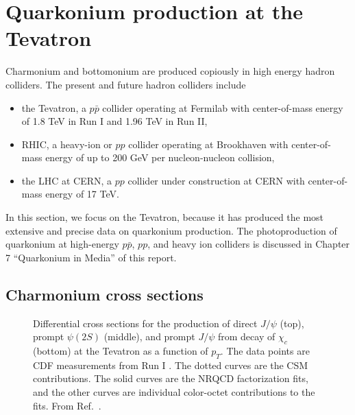 \section{Quarkonium production at the Tevatron}
\label{prodsec:tevatron}
Charmonium and bottomonium are produced copiously in high energy hadron
colliders. The present and future hadron colliders include
%
\begin{itemize}

\item the Tevatron, 
a $p \bar p$ collider operating at Fermilab with center-of-mass energy 
of 1.8 TeV in Run I and 1.96 TeV in Run II,
 
\item RHIC, 
a heavy-ion or $p p$ collider operating at Brookhaven with 
center-of-mass energy of up to 200 GeV per nucleon-nucleon collision,

\item 
the LHC at CERN, a $p p$ collider under construction at CERN 
with center-of-mass energy of 17 TeV.
\end{itemize}
%
In this section, we focus on the Tevatron, because it has produced 
the most extensive and precise data on quarkonium production.
The photoproduction of quarkonium at high-energy $p\bar{p}$, $pp$, 
and heavy ion colliders is discussed in Chapter 7 ``Quarkonium
in Media'' of this report. 


\subsection{Charmonium cross sections}
\label{prodsec:tevatroncharm}

\begin{figure}[htbp]
\begin{center}
\vspace{-0.5cm}
\vspace{-0.5cm}
\vspace{-0.5cm}
\caption{Differential cross sections for the production of direct
$J/\psi$ (top), prompt $\psi(2S)$ (middle), and prompt $J/\psi$ from
decay of $\chi_c$ (bottom) at the Tevatron as a function of $p_T$.
The data points are CDF measurements from Run I
\cite{Abe:1997jz,Abe:1997yz}.  The dotted curves are the CSM
contributions.  The solid curves are the NRQCD factorization fits, and
the other curves are individual color-octet contributions to the
fits. From Ref.~\cite{Kramer:2001hh}.  }
\label{fig-tevatron_psi}
\end{center}
\end{figure}

